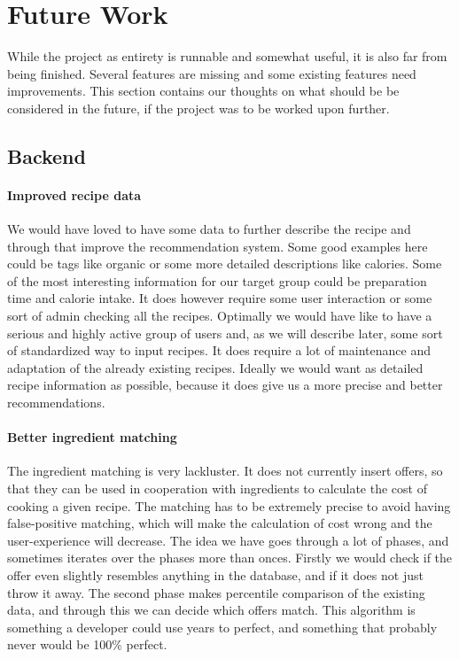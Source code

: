 \section{Future Work}
\label{sec:future}

While the project as entirety is runnable and somewhat useful, it is also far from being finished. Several features are missing and some existing features need improvements. This section contains our thoughts on what should be be considered in the future, if the project was to be worked upon further.

\subsection{Backend}

\paragraph{Improved recipe data} 
We would have loved to have some data to further describe the recipe and through that improve the recommendation system. Some good examples here could be tags like organic or some more detailed descriptions like calories. Some of the most interesting information for our target group could be preparation time and calorie intake. It does however require some user interaction or some sort of admin checking all the recipes. Optimally we would have like to have a serious and highly active group of users and, as we will describe later, some sort of standardized way to input recipes. It does require a lot of maintenance and adaptation of the already existing recipes. Ideally we would want as detailed recipe information as possible, because it does give us a more precise and better recommendations.

\paragraph{Better ingredient matching}
The ingredient matching is very lackluster. It does not currently insert offers, so that they can be used in cooperation with ingredients to calculate the cost of cooking a given recipe. The matching has to be extremely precise to avoid having false-positive matching, which will make the calculation of cost wrong and the user-experience will decrease. 
The idea we have goes through a lot of phases, and sometimes iterates over the phases more than onces. Firstly we would check if the offer even slightly resembles anything in the database, and if it does not just throw it away. The second phase makes percentile comparison of the existing data, and through this we can decide which offers match. This algorithm is something a developer could use years to perfect, and something that probably never would be 100\% perfect.

